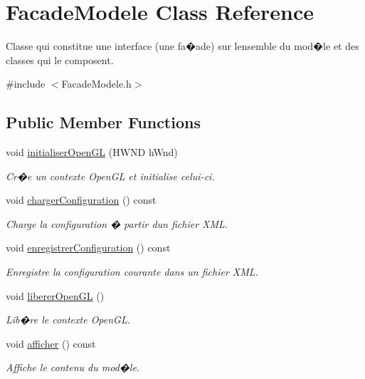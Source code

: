 \hypertarget{class_facade_modele}{}\section{Facade\+Modele Class Reference}
\label{class_facade_modele}


Classe qui constitue une interface (une fa�ade) sur l\textquotesingle{}ensemble du mod�le et des classes qui le composent.  




{\ttfamily \#include $<$Facade\+Modele.\+h$>$}

\subsection*{Public Member Functions}
\begin{DoxyCompactItemize}
\item 
void \hyperlink{group__inf2990_gabf12ccafbabf1049cb8327cf78699a1b}{initialiser\+Open\+GL} (H\+W\+ND h\+Wnd)
\begin{DoxyCompactList}\small\item\em Cr�e un contexte Open\+GL et initialise celui-\/ci. \end{DoxyCompactList}\item 
void \hyperlink{group__inf2990_ga4128d21c2ccdaefdb8a2ae7929bb2175}{charger\+Configuration} () const
\begin{DoxyCompactList}\small\item\em Charge la configuration � partir d\textquotesingle{}un fichier X\+ML. \end{DoxyCompactList}\item 
void \hyperlink{group__inf2990_gaa38f6ffdb4ae0b8e77e0108a57da2714}{enregistrer\+Configuration} () const
\begin{DoxyCompactList}\small\item\em Enregistre la configuration courante dans un fichier X\+ML. \end{DoxyCompactList}\item 
void \hyperlink{group__inf2990_gac7b831ce13626514e9637c4533d7c15d}{liberer\+Open\+GL} ()
\begin{DoxyCompactList}\small\item\em Lib�re le contexte Open\+GL. \end{DoxyCompactList}\item 
void \hyperlink{group__inf2990_ga0bdd801a0d7be5059c4d9ff8f55f6b62}{afficher} () const
\begin{DoxyCompactList}\small\item\em Affiche le contenu du mod�le. \end{DoxyCompactList}\item 

\end{DoxyCompactItemize}
